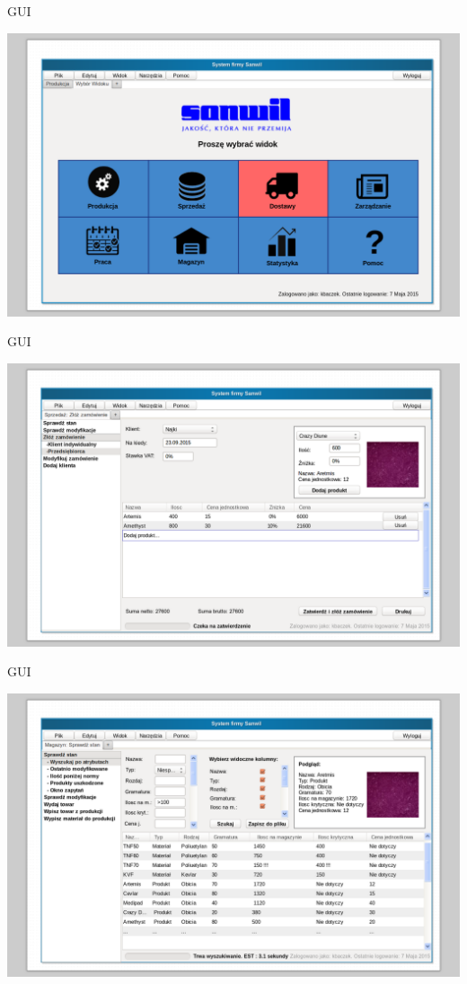 \documentclass{beamer}
\begin{document}
\begin{frame}{GUI}
\begin{block}
\centering
\includegraphics[scale=0.19]{nowa_karta.png}
\end{block}
\end{frame}

\begin{frame}{GUI}
\begin{block}
\centering
\includegraphics[scale=0.19]{sprzedaz.png}
\end{block}
\end{frame}

\begin{frame}{GUI}
\begin{block}
\centering
\includegraphics[scale=0.19]{magazyn.png}
\end{block}
\end{frame}
\end{document}
